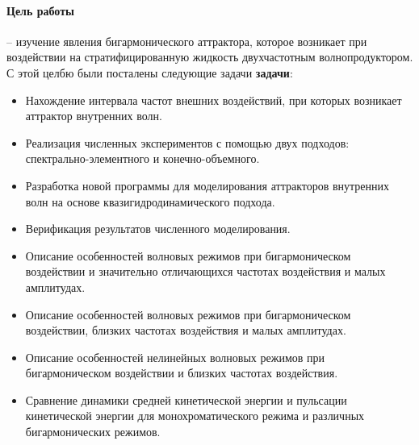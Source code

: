 

\paragraph{Цель работы} -- изучение явления бигармонического аттрактора, которое возникает при воздействии на стратифицированную жидкость двухчастотным волнопродуктором.  
С этой целбю были посталены следующие задачи \textbf{задачи}:

\begin{itemize}

  \item Нахождение интервала частот внешних воздействий, при которых возникает аттрактор внутренних волн.
  

    
    
  \item Реализация численных экспериментов с помощью двух подходов: спектрально-элементного и конечно-объемного.

  \item Разработка новой программы для моделирования аттракторов внутренних волн на основе квазигидродинамического подхода.
    
  \item Верификация результатов численного моделирования.

  \item Описание особенностей волновых режимов при бигармоническом воздействии и значительно отличающихся частотах воздействия и малых амплитудах.

  \item Описание особенностей волновых режимов при бигармоническом воздействии, близких частотах воздействия и малых амплитудах.
    
  \item Описание особенностей нелинейных волновых режимов при бигармоническом воздействии и близких частотах воздействия.

  \item Сравнение динамики средней кинетической энергии и пульсации кинетической энергии для монохроматического режима и различных бигармонических режимов.
    

    
\end{itemize}

